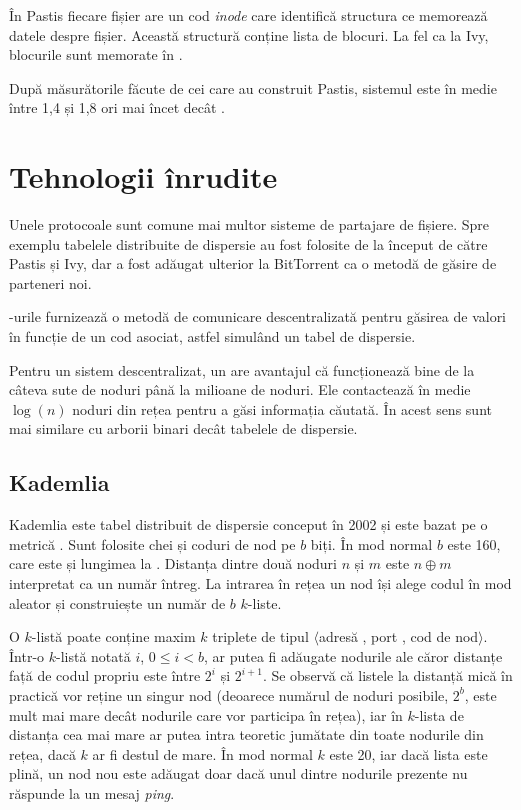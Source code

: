 \documentclass[a4wide,12pt]{report}
\newcommand{\eng}[1]{\emph{#1}} %
\newcommand{\uplu}[1]{$\langle$#1$\rangle$} %
\newcommand{\acr}[1]{{\textsmaller[1]{\textsc{#1}}}} %
\begin{document}
În Pastis fiecare fișier are un cod \eng{inode} care identifică structura ce memorează datele despre fișier. Această
structură conține lista de blocuri. La fel ca la Ivy, blocurile sunt memorate în \acr{TDD}.

După măsurătorile făcute de cei care au construit Pastis, sistemul este în medie între 1,4 și 1,8 ori mai încet decât
\acr{NFS}.

\section{Tehnologii înrudite} %

Unele protocoale sunt comune mai multor sisteme de partajare de fișiere. Spre exemplu tabelele distribuite de dispersie
au fost folosite de la început de către Pastis și Ivy, dar a fost adăugat ulterior la BitTorrent ca o metodă de găsire
de parteneri noi.

\acr{TDD}-urile furnizează o metodă de comunicare descentralizată pentru găsirea de valori în funcție de un cod asociat,
astfel simulând un tabel de dispersie.

Pentru un sistem descentralizat, un \acr{TDD} are avantajul că funcționează bine de la câteva sute de noduri până la
milioane de noduri. Ele contactează în medie $\log(n) $ noduri din rețea pentru a găsi informația căutată. În acest sens
sunt mai similare cu arborii binari decât tabelele de dispersie.

\subsection{Kademlia} %

Kademlia este tabel distribuit de dispersie conceput în 2002 și este bazat pe o metrică \acr{XOR}.\cite{luckadem} Sunt
folosite chei și coduri de nod pe $b$ biți. În mod normal $b$ este 160, care este și lungimea la \acr{SHA-1}. Distanța
dintre două noduri $n$ și $m$ este $n \oplus m$ interpretat ca un număr întreg. La intrarea în rețea un nod își alege
codul în mod aleator și construiește un număr de $b$ $k$-liste.

O $k$-listă poate conține maxim $k$ triplete de tipul \uplu{adresă \acr{IP}, port \acr{UDP}, cod de nod}. Într-o
$k$-listă notată $i$, $0 \leq i < b$, ar putea fi adăugate nodurile ale căror distanțe față de codul propriu este între
$2^i$ și $2^{i+1}$. Se observă că listele la distanță mică în practică vor reține un singur nod (deoarece numărul de
noduri posibile, $2^b$, este mult mai mare decât nodurile care vor participa în rețea), iar în $k$-lista de distanța cea
mai mare ar putea intra teoretic jumătate din toate nodurile din rețea, dacă $k$ ar fi destul de mare. În mod normal $k$
este 20, iar dacă lista este plină, un nod nou este adăugat doar dacă unul dintre nodurile prezente nu răspunde la un
mesaj \eng{ping}.
\end{document}
